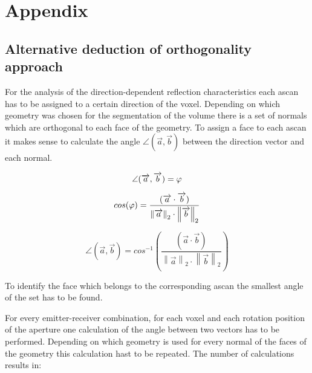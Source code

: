 \chapter{Appendix}
\label{app:appendix}

\section{Alternative deduction of orthogonality approach}
\label{Alternative_herleitung}
For the analysis of the direction-dependent reflection characteristics each \ac{ascan} has to be assigned to a certain direction of the voxel.
Depending on which geometry was chosen for the segmentation of the volume there is a set of normals which are orthogonal to each face of the geometry. To assign a face to each \ac{ascan} it makes sense to calculate the angle $\angle (\overrightarrow{a},\overrightarrow{b})$ between the direction vector and each normal.


\begin{equation}
\centering
\angle (\overrightarrow{a},\overrightarrow{b}) = \varphi
\label{eqation_angle}
\end{equation}


\begin{equation}
\centering
cos(\varphi )  =   \frac{(\overrightarrow{a} \cdot \overrightarrow{b})}{\left \| \overrightarrow{a} \right \|_2  \cdot \left \| \overrightarrow{b} \right \|_2}
\label{eqation_cos_phi}
\end{equation}

\begin{equation}
\angle (\overrightarrow{a},\overrightarrow{b}) = 
cos^{-1} \left (  
\frac{(\overrightarrow{a} \cdot \overrightarrow{b})}{\left \| \overrightarrow{a} \right \|_2  \cdot \left \| \overrightarrow{b} \right \|_2} 
\right )
\label{eqation_angle_final}
\end{equation}

To identify the face which belongs to the corresponding \ac{ascan} the smallest angle of the set has to be found.

\qquad





For every emitter-receiver combination, for each voxel and each rotation position of the aperture one calculation of the angle between two vectors has to be performed. Depending on which geometry is used for every normal of the faces of the geometry this calculation hast to be repeated. The number of calculations results in:

